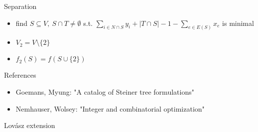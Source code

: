 \documentclass[usenames,dvipsnames]{beamer}
\begin{document}
\begin{frame}{Separation}
  \begin{itemize}
    \item find $S \subseteq V,~S \cap T \neq \emptyset$
      s.t. $\sum\limits_{i \in N \cap S} y_i + |T \cap S| - 1 -
      \sum\limits_{e \in E(S)} x_e$ is minimal
  \item $V_2 = V \setminus \{2\}$
    \item $f_2(S) = f(S \cup \{2\})$
  \end{itemize}
  \vspace{1cm}
  \begin{minipage}{0.49\textwidth}
  \begin{center}
  \end{center}
  \end{minipage}
  \begin{minipage}{0.49\textwidth}
  \end{minipage}
\end{frame}

\begin{frame}{References}
  \begin{itemize}
  \item Goemans, Myung: "A catalog of Steiner tree formulations"
  \item Nemhauser, Wolsey: "Integer and combinatorial optimization"
  \end{itemize}
\end{frame}


\begin{frame}{Lovász extension}
  
\end{frame}
\end{document}
